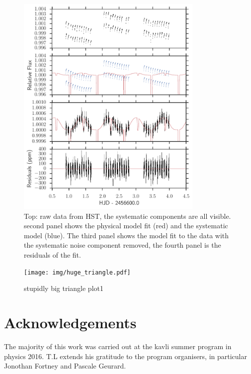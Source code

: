 \documentclass[a4paper,fleqn,usenatbib]{mnras}
\begin{document}
\begin{figure}
\begin{center}
\includegraphics[width=0.8\textwidth]{img/systematics.pdf}
\caption{Top: raw data from HST, the systematic components are all visible. second panel shows the physical model fit (red) and the systematic model (blue). The third panel shows the model fit to the data with the systematic noise component removed, the fourth panel is the residuals of the fit.
}
\label{fig:systematics}
\end{center}
\end{figure}

\begin{figure}
\begin{center}
\texttt{[image: img/huge\_triangle.pdf]}
\caption{stupidly big triangle plot1}
\label{fig:big triangle}
\end{center}
\end{figure}

\section*{Acknowledgements}

The majority of this work was carried out at the kavli summer program in physics 2016. T.L extends his gratitude to the program organisers, in particular Jonothan Fortney and Pascale Geurard.
\end{document}
